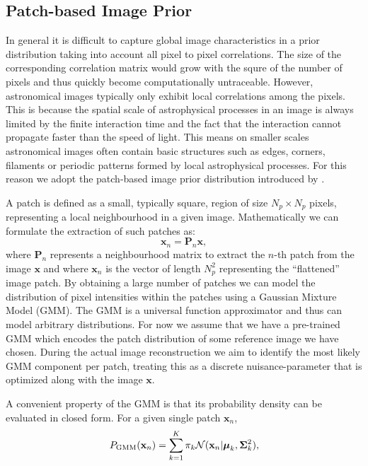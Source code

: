 \documentclass[twocolumn, linenumbers]{aastex631}
\begin{document}
    \subsection{Patch-based Image Prior}
    \label{sec:patch-prior}
    In general it is difficult to capture global image characteristics in a prior distribution taking into account all pixel to pixel correlations. The size of the corresponding correlation matrix would grow with the squre of the number of pixels  and thus quickly become computationally untraceable. However, astronomical images typically only exhibit local correlations among the pixels. This is because the spatial scale of astrophysical processes in an image is always limited by the finite interaction time and the fact that the interaction cannot propagate faster than the speed of light. This means on smaller scales astronomical images often contain basic structures such as edges, corners, filaments or periodic patterns formed by local astrophysical processes. For this reason we adopt the patch-based image prior distribution introduced by \cite{Zoran2011}. 

    A patch is defined as a small, typically square, region of size $N_p \times N_p$ pixels, representing a local neighbourhood in a given image. Mathematically we can formulate the extraction of such patches as:
    \begin{equation}
        \mathbf{x}_n = \mathbf{P}_n \mathbf{x},
    \end{equation}
    where $\mathbf{P}_n$ represents a neighbourhood matrix to extract the $n$-th patch from the image $\mathbf{x}$ and where $\mathbf{x}_n$ is the vector of length $N_p^2$ representing the \enquote{flattened} image patch. By obtaining a large number of patches we can model the distribution of pixel intensities within the patches using a Gaussian Mixture Model (GMM). The GMM is a universal function approximator and thus can model arbitrary distributions. For now we assume that we have a pre-trained GMM which encodes the patch distribution of some reference image we have chosen. During the actual image reconstruction we aim to identify the most likely GMM component per patch, treating this as a discrete nuisance-parameter that is optimized along with the image $\mathbf{x}$. 
    
    A convenient property of the GMM is that its probability density can be evaluated in closed form. For a given single patch $\mathbf{x}_n$,
    \begin{equation}
        \label{eq:gmm}
        P_{\rm GMM}(\mathbf{x}_n) = \sum_{k=1}^K \pi_k \mathcal{N}(\mathbf{x}_n| \boldsymbol{\mu}_k, \boldsymbol{\Sigma}_k^2),
    \end{equation}
\end{document}
